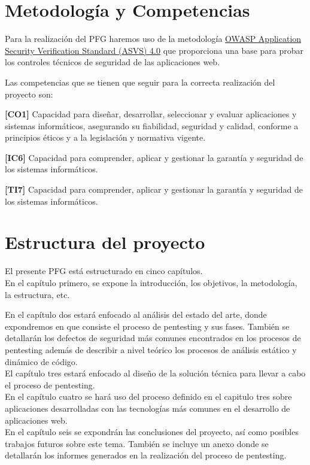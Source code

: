 \section{Metodología y Competencias}

Para la realización del PFG haremos uso de la 
metodología \href{https://owasp.org/www-pdf-archive/OWASP_Application_Security_Verification_Standard_4.0-en.pdf}{OWASP Application Security Verification Standard (ASVS) 4.0} \cite{web2} que 
proporciona una base para probar los controles técnicos de seguridad de las aplicaciones web.

Las competencias que se tienen que seguir para la correcta realización del proyecto son:

\textbf{[CO1]} Capacidad para diseñar, desarrollar, seleccionar y evaluar aplicaciones y sistemas informáticos, asegurando 
su fiabilidad, seguridad y calidad, conforme a principios éticos y a la legislación y normativa vigente.

\textbf{[IC6]} Capacidad para comprender, aplicar y gestionar la garantía y seguridad de los sistemas informáticos.

\textbf{[TI7]} Capacidad para comprender, aplicar y gestionar la garantía y seguridad de los sistemas informáticos.

\section{Estructura del proyecto}

El presente PFG está estructurado en cinco capítulos.\\

En el capítulo primero, se expone la introducción, los objetivos, la metodología, la estructura, etc.

En el capítulo dos estará enfocado al análisis del estado del arte, donde expondremos en que consiste el proceso de pentesting y 
sus fases. También se detallarán los defectos de seguridad más comunes encontrados en los procesos de pentesting 
además de describir a nivel teórico los procesos de análisis estático y dinámico de código.\\

El capítulo tres estará enfocado al diseño de la solución técnica para llevar a cabo el proceso de pentesting.\\ 

En el capítulo cuatro se hará uso del proceso definido en el capitulo tres sobre aplicaciones desarrolladas con las tecnologías 
más comunes en el desarrollo de aplicaciones web.\\

En el capítulo seis se expondrán las conclusiones del proyecto, así como posibles trabajos futuros sobre este tema.
También se incluye un anexo donde se detallarán los informes generados en la realización del proceso de pentesting.\\

\newpage
